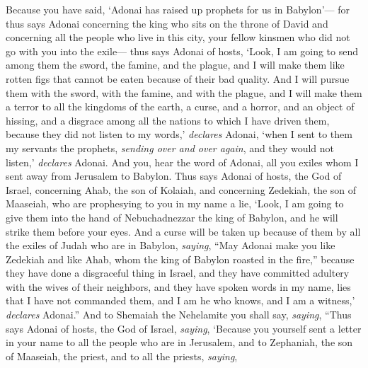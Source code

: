 \begin{biblechapter}
\verse Because you have said, ‘Adonai has raised up prophets for us in Babylon’—
\verse for thus says Adonai concerning the king who sits on the throne of David and concerning all the people who live in this city, your fellow kinsmen who did not go with you into the exile—
\verse thus says Adonai of hosts, ‘Look, I am going to send among them the sword, the famine, and the plague, and I will make them like rotten figs that cannot be eaten because of their bad quality.
\verse And I will pursue them with the sword, with the famine, and with the plague, and I will make them a terror to all the kingdoms of the earth, a curse, and a horror, and an object of hissing, and a disgrace among all the nations to which I have driven them,
\verse because they did not listen to my words,’ \textit{declares} Adonai, ‘when I sent to them my servants the prophets, \textit{sending over and over again}, and they would not listen,’ \textit{declares} Adonai.
\verse And you, hear the word of Adonai, all you exiles whom I sent away from Jerusalem to Babylon.
\verse Thus says Adonai of hosts, the God of Israel, concerning Ahab, the son of Kolaiah, and concerning Zedekiah, the son of Maaseiah, who are prophesying to you in my name a lie, ‘Look, I am going to give them into the hand of Nebuchadnezzar the king of Babylon, and he will strike them before your eyes.
\verse And a curse will be taken up because of them by all the exiles of Judah who are in Babylon, \textit{saying}, “May Adonai make you like Zedekiah and like Ahab, whom the king of Babylon roasted in the fire,”
\verse because they have done a disgraceful thing in Israel, and they have committed adultery with the wives of their neighbors, and they have spoken words in my name, lies that I have not commanded them, and I am he who knows, and I am a witness,’ \textit{declares} Adonai.”
 And to Shemaiah the Nehelamite you shall say, \textit{saying},
\verse “Thus says Adonai of hosts, the God of Israel, \textit{saying}, ‘Because you yourself sent a letter in your name to all the people who are in Jerusalem, and to Zephaniah, the son of Maaseiah, the priest, and to all the priests, \textit{saying},

\end{biblechapter}
